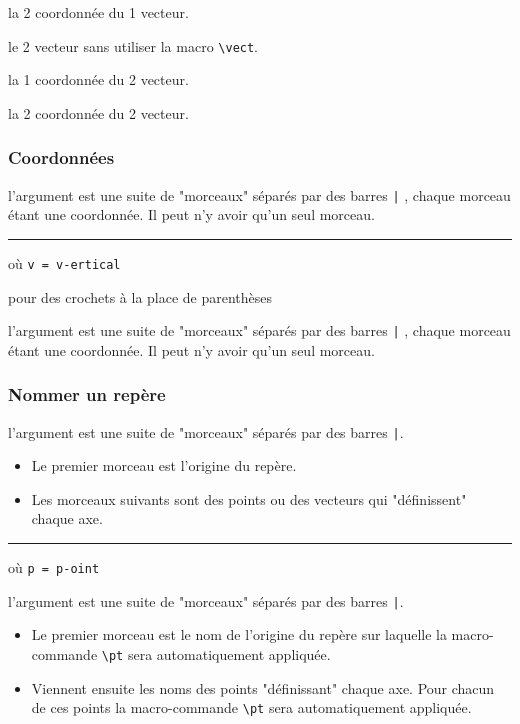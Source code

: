 \documentclass[12pt,a4paper]{article}
\newcommand\env[1]{\texttt{#1}}
\newcommand\macro[1]{\env{\textbackslash{}#1}}
\theoremstyle{definition}
\newcommand\separation{
	\medskip
	\hfill\rule{0.5\textwidth}{0.75pt}\hfill
	\medskip
}
\begin{document}
 la 2\ieme{} coordonnée du 1\ier{} vecteur.

 le 2\ieme{} vecteur sans utiliser la macro \macro{vect}.

 la 1\iere{} coordonnée du 2\ieme{} vecteur.

 la 2\ieme{} coordonnée du 2\ieme{} vecteur.
\subsubsection{Coordonnées}



\IDarg{} l'argument est une suite de "morceaux" séparés par des barres \verb+|+ , chaque morceau étant une coordonnée. Il peut n'y avoir qu'un seul morceau.


\separation


 où \quad \verb&v = v-ertical&

 pour des crochets à la place de parenthèses

\IDarg{} l'argument est une suite de "morceaux" séparés par des barres \verb+|+ , chaque morceau étant une coordonnée. Il peut n'y avoir qu'un seul morceau.
\subsubsection{Nommer un repère}



\IDarg{} l'argument est une suite de "morceaux" séparés par des barres \verb+|+.

\begin{itemize}[topsep=0pt]
	\item Le premier morceau est l'origine du repère.

	\item Les morceaux suivants sont des points ou des vecteurs qui "définissent" chaque axe.
\end{itemize}


\separation

 où \quad \verb+p = p-oint+

\IDarg{} l'argument est une suite de "morceaux" séparés par des barres \verb+|+.

\begin{itemize}[topsep=0pt]
	\item Le premier morceau est le nom de l'origine du repère sur laquelle la macro-commande \macro{pt} sera automatiquement appliquée.

	\item Viennent ensuite les noms des points "définissant" chaque axe. Pour chacun de ces points la macro-commande \macro{pt} sera automatiquement appliquée.
\end{itemize}
\end{document}
